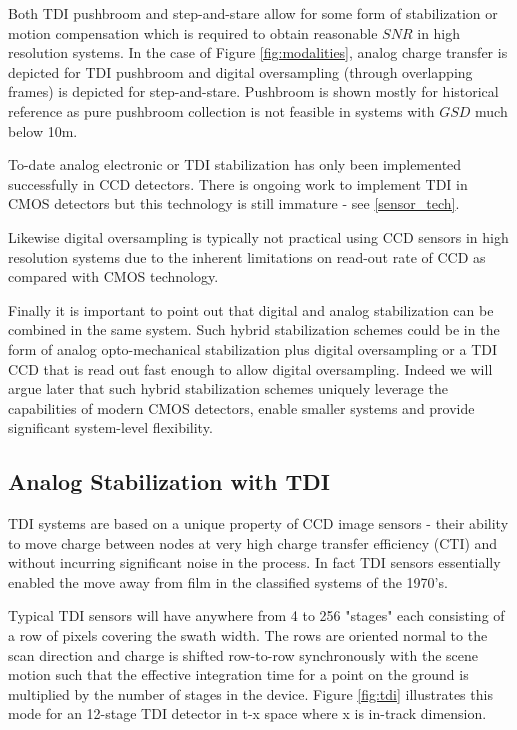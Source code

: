 \documentclass[10pt,journal]{IEEEtran}  %
\begin{document}
Both TDI pushbroom and step-and-stare allow for some form of stabilization or motion compensation which is required to obtain reasonable $SNR$ in high resolution systems.  In the case of Figure \ref{fig:modalities}, analog charge transfer is depicted for TDI pushbroom and digital oversampling (through overlapping frames) is depicted for step-and-stare.  Pushbroom is shown mostly for historical reference as pure pushbroom collection is not feasible in systems with $GSD$ much below 10m.

To-date analog electronic or TDI stabilization has only been implemented successfully in CCD detectors.  There is ongoing work to implement TDI in CMOS detectors but this technology is still immature - see \ref{sensor_tech}.  

Likewise digital oversampling is typically not practical using CCD sensors in high resolution systems due to the inherent limitations on read-out rate of CCD as compared with CMOS technology.

Finally it is important to point out that digital and analog stabilization can be combined in the same system.  Such hybrid stabilization schemes could be in the form of analog opto-mechanical stabilization plus digital oversampling or a TDI CCD that is read out fast enough to allow digital oversampling.  Indeed we will argue later that such hybrid stabilization schemes uniquely leverage the capabilities of modern CMOS detectors, enable smaller systems and provide significant system-level flexibility.

\subsection{Analog Stabilization with TDI}

TDI systems are based on a unique property of CCD image sensors - their ability to move charge between nodes at very high charge transfer efficiency (CTI) and without incurring significant noise in the process.  In fact TDI sensors essentially enabled the move away from film in the classified systems of the 1970's.

Typical TDI sensors will have anywhere from 4 to 256 "stages" each consisting of a row of pixels covering the swath width.  The rows are oriented normal to the scan direction and charge is shifted row-to-row synchronously with the scene motion such that the effective integration time for a point on the ground is multiplied by the number of stages in the device.  Figure \ref{fig:tdi} illustrates this mode for an 12-stage TDI detector in t-x space where x is in-track dimension.
\end{document}
